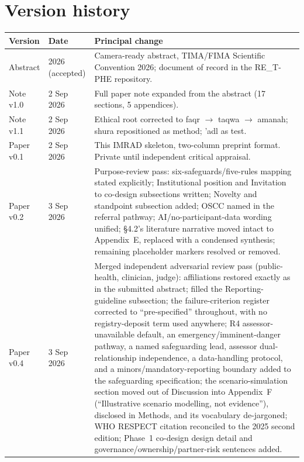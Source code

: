 \documentclass[10pt,twocolumn]{article}
\begin{document}
\section{Version history}
\footnotesize
\begin{tabularx}{\textwidth}{@{}p{1.6cm}p{2.6cm}Y@{}}
\toprule
\textbf{Version} & \textbf{Date} & \textbf{Principal change}\\
\midrule
Abstract & 2026 (accepted) & Camera-ready abstract, TIMA/FIMA Scientific Convention 2026; document of record in the RE\_T-PHE repository.\\
Note v1.0 & 2 Sep 2026 & Full paper note expanded from the abstract (17 sections, 5 appendices).\\
Note v1.1 & 2 Sep 2026 & Ethical root corrected to faqr $\rightarrow$ taqwa $\rightarrow$ amanah; shura repositioned as method; 'adl as test.\\
Paper v0.1 & 2 Sep 2026 & This IMRAD skeleton, two-column preprint format. Private until independent critical appraisal.\\
Paper v0.2 & 3 Sep 2026 & Purpose-review pass: six-safeguards/five-rules mapping stated explicitly; Institutional position and Invitation to co-design subsections written; Novelty and standpoint subsection added; OSCC named in the referral pathway; AI/no-participant-data wording unified; \S4.2's literature narrative moved intact to Appendix~E, replaced with a condensed synthesis; remaining placeholder markers resolved or removed.\\
Paper v0.4 & 3 Sep 2026 & Merged independent adversarial review pass (public-health, clinician, judge): affiliations restored exactly as in the submitted abstract; filled the Reporting-guideline subsection; the failure-criterion register corrected to ``pre-specified'' throughout, with no registry-deposit term used anywhere; R4 assessor-unavailable default, an emergency/imminent-danger pathway, a named safeguarding lead, assessor dual-relationship independence, a data-handling protocol, and a minors/mandatory-reporting boundary added to the safeguarding specification; the scenario-simulation section moved out of Discussion into Appendix~F (``Illustrative scenario modelling, not evidence''), disclosed in Methods, and its vocabulary de-jargoned; WHO RESPECT citation reconciled to the 2025 second edition; Phase~1 co-design design detail and governance/ownership/partner-risk sentences added.\\
\bottomrule
\end{tabularx}
\end{document}
